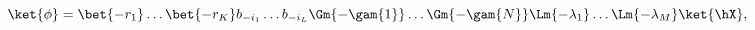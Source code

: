 \begin{equation}
%
\ket{\phi} = \bet{-r_{1}} \ldots \bet{-r_{K}} b_{-i_{1}} \ldots b_{-i_{L}} 
	\Gm{-\gam{1}} \ldots \Gm{-\gam{N}} 
	\Lm{-\lambda_{1}} \ldots \Lm{-\lambda_{M}}
	\ket{\hX},
\label{eq:statebn}
%
\end{equation}

